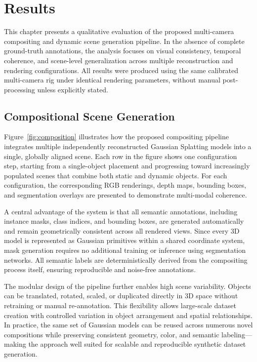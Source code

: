 \chapter{Results}

This chapter presents a qualitative evaluation of the proposed multi-camera compositing and dynamic scene generation pipeline. 
In the absence of complete ground-truth annotations, the analysis focuses on visual consistency, temporal coherence, and scene-level generalization across multiple reconstruction and rendering configurations. 
All results were produced using the same calibrated multi-camera rig under identical rendering parameters, without manual post-processing unless explicitly stated.

\section{Compositional Scene Generation}
Figure~\ref{fig:composition} illustrates how the proposed compositing pipeline integrates multiple independently reconstructed Gaussian Splatting models into a single, globally aligned scene. 
Each row in the figure shows one configuration step, starting from a single-object placement and progressing toward increasingly populated scenes that combine both static and dynamic objects.
For each configuration, the corresponding RGB renderings, depth maps, bounding boxes, and segmentation overlays are presented to demonstrate multi-modal coherence.

A central advantage of the system is that all semantic annotations, including instance masks, class indices, and bounding boxes, are generated automatically and remain geometrically consistent across all rendered views. 
Since every 3D model is represented as Gaussian primitives within a shared coordinate system, mask generation requires no additional training or inference using segmentation networks. 
All semantic labels are deterministically derived from the compositing process itself, ensuring reproducible and noise-free annotations.

The modular design of the pipeline further enables high scene variability. 
Objects can be translated, rotated, scaled, or duplicated directly in 3D space without retraining or manual re-annotation. 
This flexibility allows large-scale dataset creation with controlled variation in object arrangement and spatial relationships. 
In practice, the same set of Gaussian models can be reused across numerous novel compositions while preserving consistent geometry, color, and semantic labeling—making the approach well suited for scalable and reproducible synthetic dataset generation.

